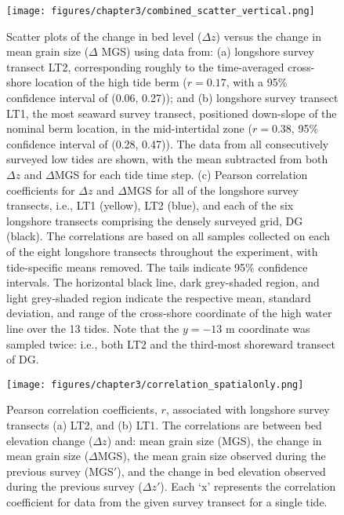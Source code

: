 \documentclass[preprint,12pt,authoryear]{elsarticle}
\begin{document}
\begin{figure}[tbp] %
	\begin{center}
		\texttt{[image: figures/chapter3/combined\_scatter\_vertical.png]}
		\caption[Cross-shore dependence of correlations between bed level and mean grain size change]{Scatter plots of the change in bed level ($\Delta z$) versus the change in mean grain size ($\Delta$ MGS) using data from: (a) longshore survey transect LT2, corresponding roughly to the time-averaged cross-shore location of the high tide berm ($r=0.17$, with a 95\% confidence interval of (0.06, 0.27)); and (b) longshore survey transect LT1, the most seaward survey transect, positioned down-slope of the nominal berm location, in the mid-intertidal zone ($r=0.38$, 95\% confidence interval of (0.28, 0.47)). The data from all consecutively surveyed low tides are shown, with the mean subtracted from both $\Delta z$ and $\Delta$MGS for each tide time step. (c) Pearson correlation coefficients for $\Delta z$ and $\Delta$MGS for all of the longshore survey transects, i.e., LT1 (yellow), LT2 (blue), and each of the six longshore transects comprising the densely surveyed grid, DG (black). The correlations are based on all samples collected on each of the eight longshore transects throughout the experiment, with tide-specific means removed. The tails indicate 95\% confidence intervals. The horizontal black line, dark grey-shaded region, and light grey-shaded region indicate the respective mean, standard deviation, and range of the cross-shore coordinate of the high water line over the 13 tides. Note that the $y=-13$ m coordinate was sampled twice: i.e., both LT2 and the third-most shoreward transect of DG.}
		\label{fig:corr_coeffs_spatial}
	\end{center}
\end{figure}

\begin{figure}[tbp] %
	\begin{center}
		\texttt{[image: figures/chapter3/correlation\_spatialonly.png]}
		\caption[Spatial correlation coefficients]{Pearson correlation coefficients, $r$, associated with longshore survey transects (a) LT2, and (b) LT1. The correlations are between bed elevation change ($\Delta z$) and: mean grain size (MGS), the change in mean grain size ($\Delta$MGS), the mean grain size observed during the previous survey (MGS$'$), and the change in bed elevation observed during the previous survey ($\Delta z'$). Each `x' represents the correlation coefficient for data from the given survey transect for a single tide.}
		\label{fig:corr_coeffs_all}
	\end{center}
\end{figure}
\end{document}
